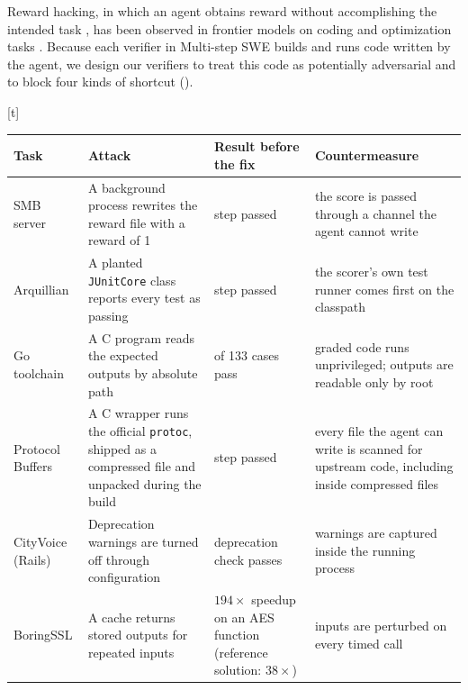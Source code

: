 \documentclass{article}
\makeatletter
\renewenvironment{table}
  {\setlength{\abovecaptionskip}{\@abovecaptionskip}%
   \setlength{\belowcaptionskip}{\@belowcaptionskip}%
   \@float{table}}
  {\end@float}
\newcommand{\bench}{Multi-step SWE\xspace}
\makeatother
\begin{document}
Reward hacking, in which an agent obtains reward without accomplishing the
intended task \citep{amodei2016concrete,skalse2022defining}, has been observed
in frontier models on coding and optimization tasks
\citep{baker2025monitoring,metr2025rewardhacking}. Because each verifier in
\bench builds and runs code written by the agent, we design our verifiers to
treat this code as potentially adversarial and to block four kinds of shortcut
().

\begin{table}[t]
  \centering
  \footnotesize
  \begin{tabularx}{\linewidth}{@{}>{\raggedright\arraybackslash}p{2.2cm} >{\raggedright\arraybackslash}X >{\raggedright\arraybackslash}p{2.6cm} >{\raggedright\arraybackslash}X@{}}
    \toprule
    Task & Attack & Result before the fix & Countermeasure \\
    \midrule
    SMB server & A background process rewrites the reward file with a reward
      of 1
      & step passed
      & the score is passed through a channel the agent cannot write \\
    Arquillian & A planted \texttt{JUnitCore} class reports every test as
      passing
      & step passed
      & the scorer's own test runner comes first on the classpath \\
    Go toolchain & A C program reads the expected outputs by absolute path
      & 62 of 133 cases pass
      & graded code runs unprivileged; outputs are readable only by root \\
    Protocol Buffers & A C wrapper runs the official \texttt{protoc}, shipped
      as a compressed file and unpacked during the build
      & step passed
      & every file the agent can write is scanned for upstream code, including
        inside compressed files \\
    CityVoice (Rails) & Deprecation warnings are turned off through
      configuration
      & deprecation check passes
      & warnings are captured inside the running process \\
    BoringSSL & A cache returns stored outputs for repeated inputs
      & $194\times$ speedup on an AES function (reference solution: $38\times$)
      & inputs are perturbed on every timed call \\
    \bottomrule
  \end{tabularx}
  \caption{Examples of attacks, found during adversarial hardening, that
    succeeded against early versions of the verifiers, and the checks that now
    block them.}
  \label{tab:hacks}
\end{table}
\end{document}
